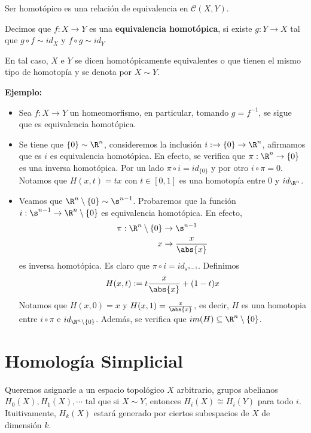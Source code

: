 \documentclass{article}
\begin{document}
\vspace{2mm}
\begin{prop}
    Ser homotópico es una relación de equivalencia en $\mathcal{C}(X,Y)$.
\end{prop}

\vspace{2mm}
\begin{dfn}
    Decimos que $f:X\to Y$ es una \textbf{equivalencia homotópica}, si existe $g:Y\to X$ tal que 
    $g\circ f\sim id_{X}$ y $f\circ g\sim id_{Y}$
\end{dfn}
\noindent En tal caso, $X$ e $Y$ se dicen homotópicamente equivalentes o que tienen el mismo tipo 
de homotopía y se denota por $X\sim Y$.

\vspace{2mm}
\noindent\textbf{Ejemplo:}
\begin{itemize}
    \item Sea $f:X\to Y$ un homeomorfismo, en particular, tomando $g=f^{-1}$, se sigue que es 
    equivalencia homotópica.

    \item Se tiene que $\{0\}\sim\R^{n}$, consideremos la inclusión $i:\to\{0\}\to\R^{n}$, 
    afirmamos que es $i$ es equivalencia homotópica. En efecto, se verifica que $\pi:\R^{n}\to
    \{0\}$ es una inversa homotópica. Por un lado $\pi\circ i=id_{\{0\}}$ y por otro 
    $i\circ\pi=0$. Notamos que $H(x,t)=tx$ con $t\in[0,1]$ es una homotopía entre $0$ y 
    $id_{\R^{n}}$.

    \item Veamos que $\R^{n}\setminus\{0\}\sim\s^{n-1}$. Probaremos que la función 
    $i:\s^{n-1}\to\R^{n}\setminus\{0\}$ es equivalencia homotópica. En efecto,
    \begin{align*}
        \pi:\R^{n}\setminus\{0\} &\to \s^{n-1} \\
        x &\to \frac{x}{\abs{x}}
    \end{align*}
    es inversa homotópica. Es claro que $\pi\circ i=id_{s^{n-1}}$. Definimos
    \begin{equation*}
        H(x,t):=t\frac{x}{\abs{x}}+(1-t)x
    \end{equation*}
    Notamos que $H(x,0)=x$ y $H(x,1)=\frac{x}{\abs{x}}$, es decir, $H$ es una homotopia entre 
    $i\circ\pi$ e $id_{\R^{n}\setminus\{0\}}$. Además, se verifica que 
    $im(H)\subseteq\R^{n}\setminus\{0\}$.
\end{itemize}

\newpage
\section{Homología Simplicial}
\noindent Queremos asignarle a un espacio topológico $X$ arbitrario, grupos abelianos 
$H_{0}(X),H_{1}(X),\cdots$ tal que si $X\sim Y$, entonces $H_{i}(X)\cong H_{i}(Y)$ para todo $i$.
Ituitivamente, $H_{k}(X)$ estará generado por ciertos subespacios de $X$ de dimensión $k$.
\end{document}
